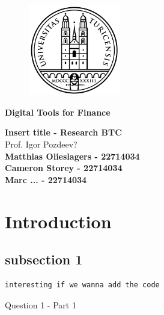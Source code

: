 \documentclass[12pt]{article}
\begin{document}
\pagestyle{empty}

\bigskip

\begin{figure}[htp]
    \centering
    \includegraphics[width=4cm]{uzh logo 2.png}
    \label{fig:UZH}
\end{figure}

\begin{Large}
	\begin{center}
		\textbf{Digital Tools for Finance}
	\end{center}
\end{Large}

\vspace{2cm}

\begin{large}	
	\begin{center}
		\textbf{Insert title - Research BTC} \vspace{0.1cm} \\ {Prof. Igor Pozdeev? } \vspace{2cm} \\ \textbf{Matthias Olieslagers - 22714034}  \\ \textbf{Cameron Storey - 22714034} \\ \textbf{Marc ... - 22714034} \vspace{2cm}
	\end{center}
\end{large}

\tableofcontents

\newpage

\bigskip
\section{Introduction}

\subsection*{subsection 1}


\begin{Program}[!htb]
\begin{lstlisting}[style=Matlab-editor,basicstyle=\mlttfamily\footnotesize]
interesting if we wanna add the code 
\end{lstlisting}
\caption{Question 1 - Part 1}
\label{Question 1 - Part 1}
\end{Program}
\end{document}
